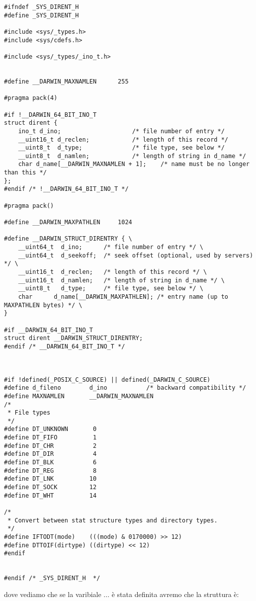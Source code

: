 \begin{lstlisting}
#ifndef _SYS_DIRENT_H
#define _SYS_DIRENT_H

#include <sys/_types.h>
#include <sys/cdefs.h>

#include <sys/_types/_ino_t.h>


#define __DARWIN_MAXNAMLEN      255

#pragma pack(4)

#if !__DARWIN_64_BIT_INO_T
struct dirent {
	ino_t d_ino;                    /* file number of entry */
	__uint16_t d_reclen;            /* length of this record */
	__uint8_t  d_type;              /* file type, see below */
	__uint8_t  d_namlen;            /* length of string in d_name */
	char d_name[__DARWIN_MAXNAMLEN + 1];    /* name must be no longer than this */
};
#endif /* !__DARWIN_64_BIT_INO_T */

#pragma pack()

#define __DARWIN_MAXPATHLEN     1024

#define __DARWIN_STRUCT_DIRENTRY { \
	__uint64_t  d_ino;      /* file number of entry */ \
	__uint64_t  d_seekoff;  /* seek offset (optional, used by servers) */ \
	__uint16_t  d_reclen;   /* length of this record */ \
	__uint16_t  d_namlen;   /* length of string in d_name */ \
	__uint8_t   d_type;     /* file type, see below */ \
	char      d_name[__DARWIN_MAXPATHLEN]; /* entry name (up to MAXPATHLEN bytes) */ \
}

#if __DARWIN_64_BIT_INO_T
struct dirent __DARWIN_STRUCT_DIRENTRY;
#endif /* __DARWIN_64_BIT_INO_T */



#if !defined(_POSIX_C_SOURCE) || defined(_DARWIN_C_SOURCE)
#define d_fileno        d_ino           /* backward compatibility */
#define MAXNAMLEN       __DARWIN_MAXNAMLEN
/*
 * File types
 */
#define DT_UNKNOWN       0
#define DT_FIFO          1
#define DT_CHR           2
#define DT_DIR           4
#define DT_BLK           6
#define DT_REG           8
#define DT_LNK          10
#define DT_SOCK         12
#define DT_WHT          14

/*
 * Convert between stat structure types and directory types.
 */
#define IFTODT(mode)    (((mode) & 0170000) >> 12)
#define DTTOIF(dirtype) ((dirtype) << 12)
#endif


#endif /* _SYS_DIRENT_H  */
\end{lstlisting}


dove vediamo che se la varibiale ... è stata definita avremo che la struttura è:


